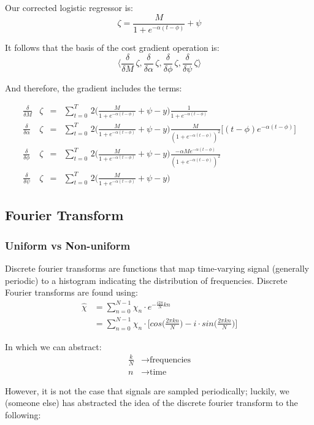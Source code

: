 \documentclass{article}
\begin{document}
Our corrected logistic regressor is:
$$ \zeta = \frac{M}{1+e^{-\alpha(t-\phi)}}  + \psi$$

It follows that the basis of the cost gradient operation is:
    $$\Big\langle \frac{\delta}{\delta M}\,\zeta, \frac{\delta}{\delta \alpha}\,\zeta, \frac{\delta}{\delta \phi}\,\zeta, \frac{\delta}{\delta \psi}\,\zeta \Big\rangle $$

And therefore, the gradient includes the terms:
\newcommand{\gradConst}{\sum_{t=0}^{T} \,2 \Big(\frac{M}{1+e^{-\alpha(t-\phi)}} + \psi - y\Big)}
\newcommand{\gradZ}{e^{-\alpha(t-\phi)}}

\begin{align*}
    \frac{\delta}{\delta M}&\zeta&=& \gradConst \frac{1}{1 + \gradZ} \\[.7em]
    \frac{\delta}{\delta \alpha}\,&\zeta&=& \gradConst \frac{M}{(1+\gradZ)^2}\Big[(t-\phi)\gradZ \Big]  \\[.7em]
    \frac{\delta}{\delta \phi}\,&\zeta&=&  \gradConst \frac{-\alpha M \gradZ}{(1+\gradZ)^2} \\[.7em]
    \frac{\delta}{\delta \psi}\,&\zeta&=& \gradConst
\end{align*}

\subsection*{Fourier Transform}
\subsubsection*{Uniform vs Non-uniform}
Discrete fourier transforms are functions that map time-varying signal (generally periodic) to a histogram indicating the distribution of frequencies. Discrete Fourier transforms are found using:
\begin{align*}
    \hat{\chi} &= \sum_{n=0}^{N-1} \chi_n \cdot e^{-\frac{i2\pi}{N} kn}\\[.7em]
    &= \sum_{n=0}^{N-1} \chi_n \cdot \Big[ cos\bigg(\frac{2\pi kn}{N}\bigg) - i\cdot sin\bigg(\frac{2\pi kn}{N}\bigg) \Big]
\end{align*}

In which we can abstract:
\begin{align}
    \frac{k}{N} &\rightarrow \text{frequencies}\\
    n &\rightarrow \text{time}
\end{align}

However, it is not the case that signals are sampled periodically; luckily, we (someone else) has abstracted the idea of the discrete fourier transform to the following:
\end{document}
